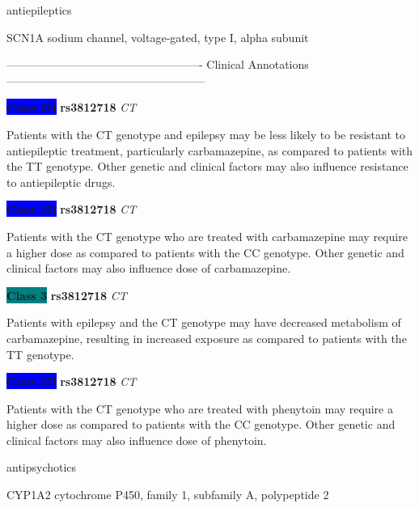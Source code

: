 \documentclass{resume} %
\begin{document}
\begin{rSection}{ antiepileptics }
\begin{rSubsection}{ SCN1A }{ sodium channel, voltage-gated, type I, alpha subunit }{}{}
\item[] ---------------------------------------------------- Clinical Annotations -----------------------------------------------------\newline
\item \textbf{\colorbox{blue} {Class 2B}} \textbf{ rs3812718 } \textit{ CT }
\item[] Patients with the CT genotype and epilepsy may be less likely to be resistant to antiepileptic treatment, particularly carbamazepine, as compared to patients with the TT genotype. Other genetic and clinical factors may also influence resistance to antiepileptic drugs.\item \textbf{\colorbox{blue} {Class 2B}} \textbf{ rs3812718 } \textit{ CT }
\item[] Patients with the CT genotype who are treated with carbamazepine may require a higher dose as compared to patients with the CC genotype. Other genetic and clinical factors may also influence dose of carbamazepine.\item \textbf{\colorbox{teal} {Class 3}} \textbf{ rs3812718 } \textit{ CT }
\item[] Patients with epilepsy and the CT genotype may have decreased metabolism of carbamazepine, resulting in increased exposure as compared to patients with the TT genotype. \item \textbf{\colorbox{blue} {Class 2B}} \textbf{ rs3812718 } \textit{ CT }
\item[] Patients with the CT genotype who are treated with phenytoin may require a higher dose as compared to patients with the CC genotype. Other genetic and clinical factors may also influence dose of phenytoin.
\end{rSubsection}

\end{rSection}\begin{rSection}{ antipsychotics }
\item[]

\begin{rSubsection}{ CYP1A2 }{ cytochrome P450, family 1, subfamily A, polypeptide 2 }{}{}
\item[]


\end{rSubsection}
\end{rSection}
\end{document}
